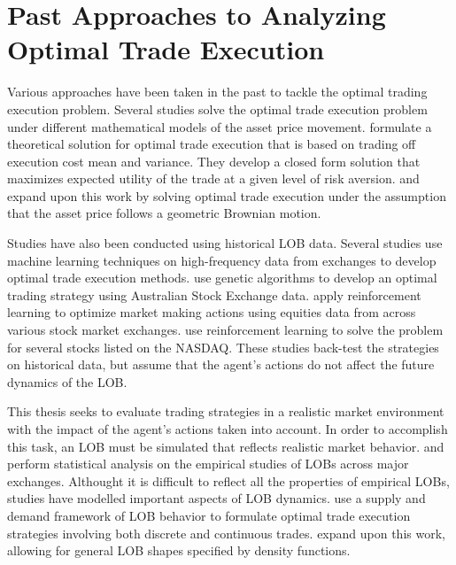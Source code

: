 \section{Past Approaches to Analyzing Optimal Trade Execution}
Various approaches have been taken in the past to tackle the optimal trading execution problem. Several studies solve the optimal trade execution problem under different mathematical models of the asset price movement. \cite{A1} formulate a theoretical solution for optimal trade execution that is based on trading off execution cost mean and variance. They develop a closed form solution that maximizes expected utility of the trade at a given level of risk aversion. \cite{A1a} and \cite{A1b} expand upon this work by solving optimal trade execution under the assumption that the asset price follows a geometric Brownian motion. 

Studies have also been conducted using historical LOB data. Several studies use machine learning techniques on high-frequency data from exchanges to develop optimal trade execution methods. \cite{A5} use genetic algorithms to develop an optimal trading strategy using Australian Stock Exchange data. \cite{A4} apply reinforcement learning to optimize market making actions using equities data from across various stock market exchanges. \cite{A3} use reinforcement learning to solve the problem for several stocks listed on the NASDAQ. These studies back-test the strategies on historical data, but assume that the agent's actions do not affect the future dynamics of the LOB.

This thesis seeks to evaluate trading strategies in a realistic market environment with the impact of the agent’s actions taken into account. In order to accomplish this task, an LOB must be simulated that reflects realistic market behavior. \cite{A10a} and \cite{A10b} perform statistical analysis on the empirical studies of LOBs across major exchanges. Althought it is difficult to reflect all the properties of empirical LOBs, studies have modelled important aspects of LOB dynamics. \cite{A11} use a supply and demand framework of LOB behavior to formulate optimal trade execution strategies involving both discrete and continuous trades. \cite{A2} expand upon this work, allowing for general LOB shapes specified by density functions.

